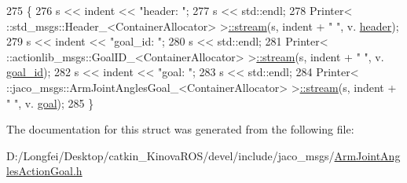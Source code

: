 \begin{DoxyCode}
275   \{
276     s << indent << \textcolor{stringliteral}{"header: "};
277     s << std::endl;
278     Printer< ::std\_msgs::Header\_<ContainerAllocator> >\hyperlink{structros_1_1message__operations_1_1Printer_3_01_1_1jaco__msgs_1_1ArmJointAnglesActionGoal___3_01ContainerAllocator_01_4_01_4_a37b188ab33c040fc6fd932f366e7563e}{::stream}(s, indent + \textcolor{stringliteral}{"  "}, v.
      \hyperlink{structjaco__msgs_1_1ArmJointAnglesActionGoal___a22314506f0a5afc168c1520293c0face}{header});
279     s << indent << \textcolor{stringliteral}{"goal\_id: "};
280     s << std::endl;
281     Printer< ::actionlib\_msgs::GoalID\_<ContainerAllocator> >\hyperlink{structros_1_1message__operations_1_1Printer_3_01_1_1jaco__msgs_1_1ArmJointAnglesActionGoal___3_01ContainerAllocator_01_4_01_4_a37b188ab33c040fc6fd932f366e7563e}{::stream}(s, indent + \textcolor{stringliteral}{"  "}, v.
      \hyperlink{structjaco__msgs_1_1ArmJointAnglesActionGoal___a39cdbc82b664305b99e55ff1fe6bddd2}{goal\_id});
282     s << indent << \textcolor{stringliteral}{"goal: "};
283     s << std::endl;
284     Printer< ::jaco\_msgs::ArmJointAnglesGoal\_<ContainerAllocator> >\hyperlink{structros_1_1message__operations_1_1Printer_3_01_1_1jaco__msgs_1_1ArmJointAnglesActionGoal___3_01ContainerAllocator_01_4_01_4_a37b188ab33c040fc6fd932f366e7563e}{::stream}(s, indent + \textcolor{stringliteral}{"  "}, v.
      \hyperlink{structjaco__msgs_1_1ArmJointAnglesActionGoal___a49d89800555751e2af0e706f63117a49}{goal});
285   \}
\end{DoxyCode}


The documentation for this struct was generated from the following file\+:\begin{DoxyCompactItemize}
\item 
D\+:/\+Longfei/\+Desktop/catkin\+\_\+\+Kinova\+R\+O\+S/devel/include/jaco\+\_\+msgs/\hyperlink{ArmJointAnglesActionGoal_8h}{Arm\+Joint\+Angles\+Action\+Goal.\+h}\end{DoxyCompactItemize}
